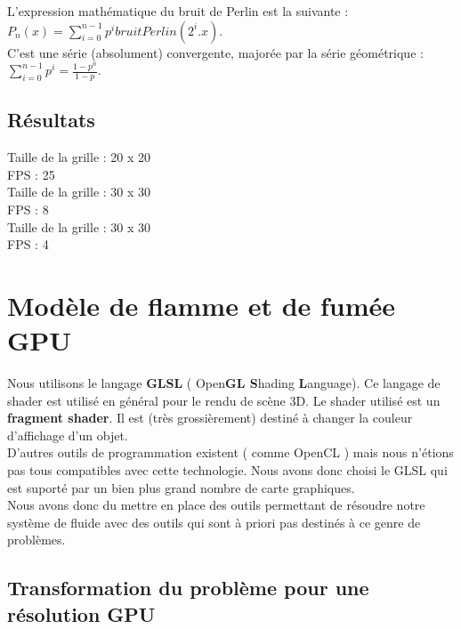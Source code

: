 \documentclass[a4paper,10pt]{article}
\begin{document}
L'expression mathématique du bruit de Perlin est la suivante :\\
$P_n(x) = \sum_{i=0}^{n-1} p^i bruitPerlin(2^i.x)$.\\
C'est une série (absolument) convergente, majorée par la série géométrique :\\
$\sum_{i=0}^{n-1} p^i = \frac{1 - p^n}{1 - p}$.\\

\subsection{Résultats}

Taille de la grille : 20 x 20 \\
FPS : 25\\

Taille de la grille : 30 x 30 \\
FPS : 8\\

Taille de la grille : 30 x 30 \\
FPS : 4\\

\section{Modèle de flamme et de fumée GPU}

Nous utilisons le langage \textbf{GLSL} ( Open\textbf{GL S}hading
\textbf{L}anguage).  Ce langage de shader est utilisé en général pour
le rendu de scène 3D. Le shader utilisé est un \textbf{fragment
  shader}.  Il est (très grossièrement) destiné à changer la couleur
d'affichage d'un objet.\\ D'autres outils de programmation existent (
comme OpenCL ) mais nous n'étions pas tous compatibles avec cette
technologie.  Nous avons donc choisi le GLSL qui est suporté par un
bien plus grand nombre de carte graphiques.\\

Nous avons donc du mettre en place des outils permettant de résoudre
notre système de fluide avec des outils qui sont à priori pas destinés
à ce genre de problèmes.

\subsection{Transformation du problème pour une résolution GPU}
\end{document}
